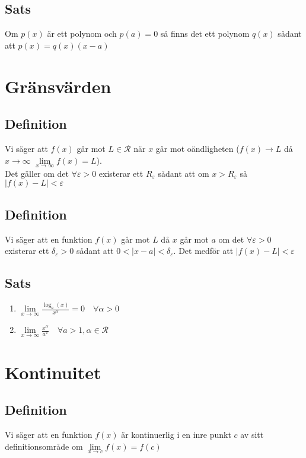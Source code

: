 \documentclass{article}
\begin{document}
\subsection{Sats}
Om $p(x)$ är ett polynom och $p(a)=0$ så finns det ett polynom $q(x)$ sådant att $p(x)=q(x)(x-a)$

\section{Gränsvärden}
\subsection{Definition}
Vi säger att $f(x)$ går mot $L\in \mathcal{R}$ när $x$ går mot oändligheten ($f(x) \to L$ då $x \rightarrow \infty$ $\lim\limits_{x \to\infty} f(x)=L$).\\
Det gäller om det $\forall\varepsilon>0$ existerar ett $R_{\varepsilon}$ sådant att om $x>R_{\varepsilon}$ så $|f(x)-L|<\varepsilon$

\subsection{Definition}
Vi säger att en funktion $f(x)$ går mot $L$ då $x$ går mot $a$ om det $\forall\varepsilon>0$ existerar ett $\delta_{\varepsilon}>0$ sådant att $0<|x-a|<\delta_{\varepsilon}$. Det medför att $|f(x)-L|<\varepsilon$


\subsection{Sats}
\begin{enumerate}
   \item $\lim\limits_{x\to\infty}\frac{\log_a(x)}{x^\alpha}=0 \quad \forall\alpha > 0$
   \item $\lim\limits_{x\to\infty}\frac{x^\alpha}{a^x}\quad \forall a>1,\alpha \in \mathcal{R}$
\end{enumerate}

\section{Kontinuitet}
\subsection{Definition}
Vi säger att en funktion $f(x)$ är kontinuerlig i en inre punkt $c$ av sitt definitionsområde om $\lim\limits_{x\to c}f(x)=f(c)$
\end{document}
